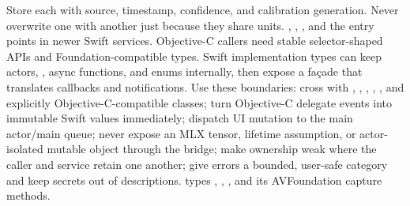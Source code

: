 {}Store each with source, timestamp, confidence, and calibration generation. Never overwrite one with another just because they share units.\markdownRendererInterblockSeparator
{}
\markdownRendererSectionEnd \markdownRendererSectionBegin
{}\markdownRendererInterblockSeparator
{}\markdownRendererBlockQuoteBegin
{} , , , and the  entry points in newer Swift services.\markdownRendererBlockQuoteEnd \markdownRendererInterblockSeparator
{}Objective-C callers need stable selector-shaped APIs and Foundation-compatible types. Swift implementation types can keep actors, , async functions, and enums internally, then expose a façade that translates callbacks and notifications.\markdownRendererParagraphSeparator
{}Use these boundaries:\markdownRendererInterblockSeparator
{}\markdownRendererUlBegin
\markdownRendererUlItem cross with , , , , , and explicitly Objective-C-compatible classes;\markdownRendererUlItemEnd 
\markdownRendererUlItem turn Objective-C delegate events into immutable Swift values immediately;\markdownRendererUlItemEnd 
\markdownRendererUlItem dispatch UI mutation to the main actor/main queue;\markdownRendererUlItemEnd 
\markdownRendererUlItem never expose an MLX tensor,  lifetime assumption, or actor-isolated mutable object through the bridge;\markdownRendererUlItemEnd 
\markdownRendererUlItem make ownership weak where the caller and service retain one another;\markdownRendererUlItemEnd 
\markdownRendererUlItem give errors a bounded, user-safe category and keep secrets out of descriptions.\markdownRendererUlItemEnd 
\markdownRendererUlEnd \markdownRendererInterblockSeparator
{}
\markdownRendererSectionEnd \markdownRendererSectionBegin
{}\markdownRendererInterblockSeparator
{}\markdownRendererBlockQuoteBegin
{}  types , , , and its AVFoundation capture methods.\markdownRendererBlockQuoteEnd \markdownRendererInterblockSeparator
